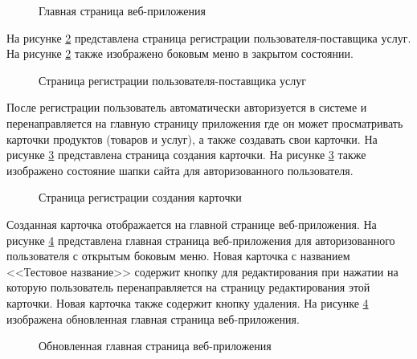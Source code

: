 \begin{figure}[H] %
\caption{Главная страница веб-приложения}
\label{test-front1:image}
\end{figure}

На рисунке \ref{test-front2:image} представлена страница регистрации пользователя-поставщика услуг. На рисунке \ref{test-front2:image} также изображено боковым меню в закрытом состоянии.

\begin{figure}[H] %
\caption{Страница регистрации пользователя-поставщика услуг}
\label{test-front2:image}
\end{figure}

После регистрации пользователь автоматически авторизуется в системе и перенаправляется на главную страницу приложения где он может просматривать карточки продуктов (товаров и услуг), а также создавать свои карточки. На рисунке \ref{test-front3:image} представлена страница создания карточки. На рисунке \ref{test-front3:image} также изображено состояние шапки сайта для авторизованного пользователя.

\begin{figure}[H] %
\caption{Страница регистрации создания карточки}
\label{test-front3:image}
\end{figure}

Созданная карточка отображается на главной странице веб-приложения. На рисунке \ref{test-front4:image} представлена главная страница веб-приложения для авторизованного пользователя с открытым боковым меню. Новая карточка с названием <<Тестовое название>> содержит кнопку для редактирования при нажатии на которую пользователь перенаправляется на страницу редактирования этой карточки. Новая карточка также содержит кнопку удаления. На рисунке \ref{test-front4:image} изображена обновленная главная страница веб-приложения.

\begin{figure}[H] %
\caption{Обновленная главная страница веб-приложения}
\label{test-front4:image}
\end{figure}

